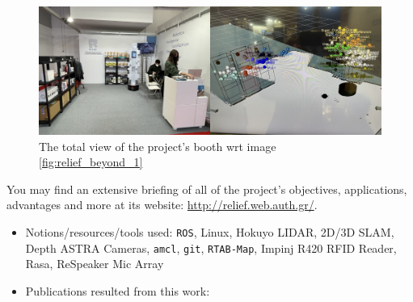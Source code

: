 
\begin{figure}[H]\centering
  \includegraphics[scale=0.5]{images/relief_2.png}
  \caption{\small The total view of the project's booth wrt image
           \ref{fig:relief_beyond_1}}
  \label{fig:relief_beyond_2}
\end{figure}


You may find an extensive briefing of all of the project's objectives,
applications, advantages and more at its website:
\url{http://relief.web.auth.gr/}.



\begin{itemize}
  \item Notions/resources/tools used: \texttt{ROS}, Linux, Hokuyo LIDAR, 2D/3D SLAM, Depth ASTRA Cameras, \texttt{amcl}, \texttt{git}, \texttt{RTAB-Map}, Impinj R420 RFID Reader, Rasa, ReSpeaker Mic Array
  \item Publications resulted from this work: \cite{9617436,Filotheou2022a,FILOTHEOU2023100288,10160120,9981228}
\end{itemize}
